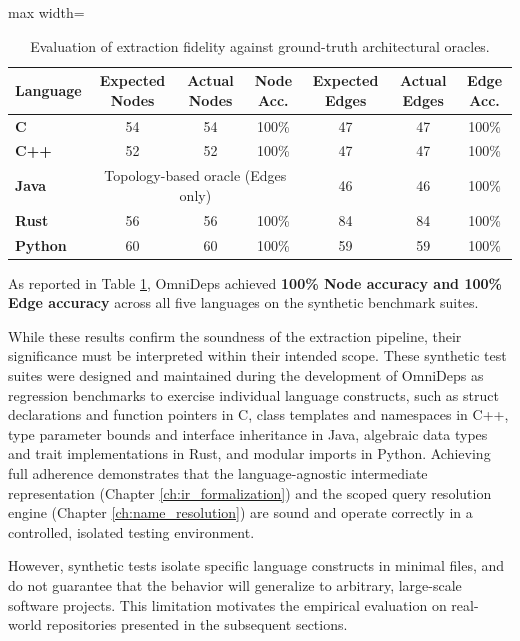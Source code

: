 \begin{table}[htpb]
  \centering
  \small
  \begin{adjustbox}{max width=\textwidth}
    \begin{tabular}{|l|c|c|c|c|c|c|}
      \hline
      \textbf{Language} & \textbf{Expected Nodes} &
      \textbf{Actual Nodes} & \textbf{Node Acc.} &
      \textbf{Expected Edges} & \textbf{Actual Edges} &
      \textbf{Edge Acc.} \\ \hline
      \textbf{C}        & 54  & 54  & 100\% & 47 & 47 & 100\% \\ \hline
      \textbf{C++}      & 52  & 52  & 100\% & 47 & 47 & 100\% \\ \hline
      \textbf{Java}     & \multicolumn{3}{c|}{Topology-based oracle
      (Edges only)}
      & 46 & 46 & 100\% \\ \hline
      \textbf{Rust}     & 56  & 56  & 100\% & 84 & 84 & 100\% \\ \hline
      \textbf{Python}   & 60  & 60  & 100\% & 59 & 59 & 100\% \\ \hline
    \end{tabular}
  \end{adjustbox}
  \caption{Evaluation of extraction fidelity against ground-truth
  architectural oracles.}
  \label{tab:microbenchmark_oracle_results}
\end{table}

As reported in Table \ref{tab:microbenchmark_oracle_results}, OmniDeps
achieved \textbf{100\% Node accuracy and 100\% Edge accuracy} across
all five languages on the synthetic benchmark suites.

While these results confirm the soundness of the extraction pipeline,
their significance must be interpreted within their intended scope.
These synthetic test suites were designed and maintained during the
development of OmniDeps as regression benchmarks to exercise individual
language constructs, such as struct declarations and function pointers in
C, class templates and namespaces in C++, type parameter bounds and
interface inheritance in Java, algebraic data types and trait
implementations in Rust, and modular imports in Python. Achieving full
adherence demonstrates that the language-agnostic intermediate
representation (Chapter \ref{ch:ir_formalization}) and the scoped query
resolution engine (Chapter \ref{ch:name_resolution}) are sound and
operate correctly in a controlled, isolated testing environment.

However, synthetic tests isolate specific language constructs in
minimal files,
and do not guarantee that the behavior will generalize to arbitrary,
large-scale software projects. This limitation motivates the
empirical evaluation on real-world repositories presented in the
subsequent sections.

